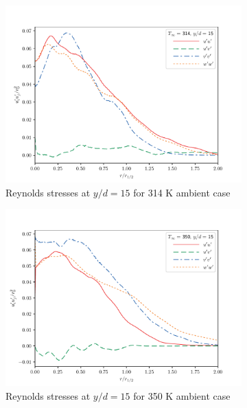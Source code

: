 \begin{figure}[ht!]
\begin{center}
\begin{subfigure}{0.45\textwidth}
	\includegraphics[scale=.45]{figures/Plots/radial/slices_5/314_ambient/Rey_Stress_0_15.pdf}
	\caption{Reynolds stresses at $y/d=15$ for 314 K ambient case} \label{314_rey_15}
\end{subfigure}
\begin{subfigure}{0.45\textwidth}
	\includegraphics[scale=.45]{figures/Plots/radial/slices_5/350_ambient/Rey_Stress_0_15.pdf}
	\caption{Reynolds stresses at $y/d=15$ for 350 K ambient case} \label{350_rey_15}
\end{subfigure}
\vfill
\begin{subfigure}{0.45\textwidth}

\end{subfigure}
\end{center}
\end{figure}
